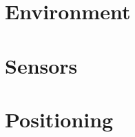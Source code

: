 \documentclass[11pt]{report}
\begin{document}



\tableofcontents

\chapter{Environment} \label{chap:environment}


\chapter{Sensors}\label{chap:sensors}


\chapter{Positioning}\label{chap:positioning}



\listoffigures
\listoftables
{}

\end{document}
